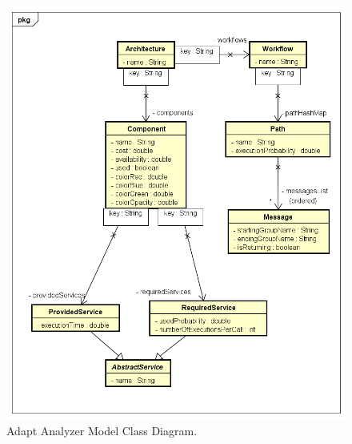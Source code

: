 \begin{figure}[ht]
	\centerline
	{\includegraphics[scale=0.60]{img/adaptanalyzerclassdiag.png}}
	\caption[Adapt Analyzer Model Class Diagram]{Adapt Analyzer Model Class Diagram.}
	\label{fig:aa-class}
\end{figure}

